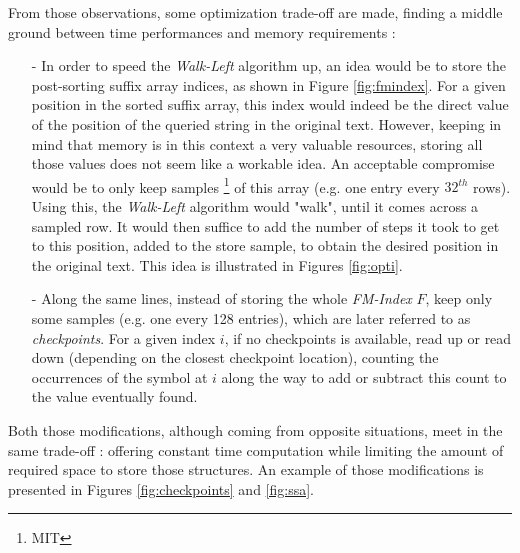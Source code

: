 From those observations, some optimization trade-off are made,  finding a middle ground between time performances and memory requirements :
	\begin{itemize}
		\item [-] In order to speed the \textsl{Walk-Left} algorithm up, an idea would be to store the post-sorting suffix array indices, as shown in Figure \ref{fig:fmindex}. For a given position in the sorted suffix array, this index would indeed be the direct value of the position of the queried string in the original text. However, keeping in mind that memory is in this context a very valuable resources, storing all those values does not seem like a workable idea. An acceptable compromise would be to only keep samples \footnote{MIT} of this array (e.g. one entry every $32^{th}$ rows). Using this, the \textsl{Walk-Left} algorithm would "walk", until it comes across a sampled row. It would then suffice to add the number of steps it took to get to this position, added to the store sample, to obtain the desired position in the original text. This idea is illustrated in Figures \ref{fig:opti}.

		\item [-] Along the same lines, instead of storing the whole \textsl{FM-Index} $F$, keep only some samples (e.g. one every 128 entries), which are later referred to as \textit{checkpoints}. For a given index $i$, if no checkpoints is available, read up or read down (depending on the closest checkpoint location), counting the occurrences of the symbol at $i$ along the way to add or subtract this count to the value eventually found.
				\end{itemize}
	
Both those modifications, although coming from opposite situations, meet in the same trade-off : offering constant time computation while limiting the amount of required space to store those structures. An example of those modifications is presented in Figures \ref{fig:checkpoints} and \ref{fig:ssa}.


